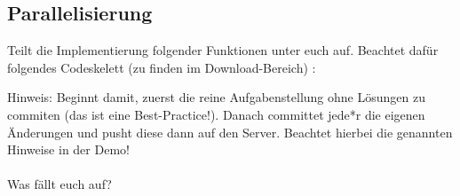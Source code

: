 \subsection{Parallelisierung}
Teilt die Implementierung folgender Funktionen unter euch auf. Beachtet dafür folgendes Codeskelett (zu finden im Download-Bereich)
:

Hinweis: Beginnt damit, zuerst die reine Aufgabenstellung ohne Lösungen zu commiten (das ist eine Best-Practice!).
Danach committet jede*r die eigenen Änderungen und pusht diese dann auf den Server.
Beachtet hierbei die genannten Hinweise in der Demo!\\\\
Was fällt euch auf?

